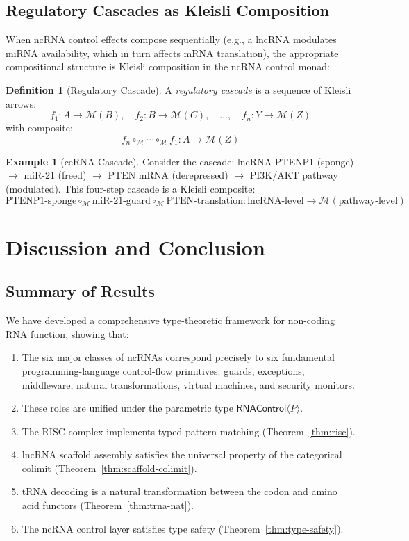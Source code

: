 \documentclass[12pt,a4paper]{article}
\theoremstyle{definition}
\newtheorem{definition}[theorem]{Definition}
\newtheorem{example}[theorem]{Example}
\newcommand{\RNAType}{\mathsf{RNAControl}}
\begin{document}
\subsection{Regulatory Cascades as Kleisli Composition}

When ncRNA control effects compose sequentially (e.g., a lncRNA
modulates miRNA availability, which in turn affects mRNA translation),
the appropriate compositional structure is Kleisli composition in the
ncRNA control monad:

\begin{definition}[Regulatory Cascade]
A \emph{regulatory cascade} is a sequence of Kleisli arrows:
\[
  f_1 : A \to \mathcal{M}(B), \quad
  f_2 : B \to \mathcal{M}(C), \quad \ldots, \quad
  f_n : Y \to \mathcal{M}(Z)
\]
with composite:
\[
  f_n \circ_{\mathcal{M}} \cdots \circ_{\mathcal{M}} f_1
  : A \to \mathcal{M}(Z)
\]
\end{definition}

\begin{example}[ceRNA Cascade]
Consider the cascade: lncRNA PTENP1 (sponge) $\to$ miR-21 (freed) $\to$
PTEN mRNA (derepressed) $\to$ PI3K/AKT pathway (modulated).  This
four-step cascade is a Kleisli composite:
\[
  \text{PTENP1-sponge} \circ_{\mathcal{M}} \text{miR-21-guard}
  \circ_{\mathcal{M}} \text{PTEN-translation}
  : \text{lncRNA-level} \to \mathcal{M}(\text{pathway-level})
\]
\end{example}

\section{Discussion and Conclusion}\label{sec:discussion}

\subsection{Summary of Results}

We have developed a comprehensive type-theoretic framework for
non-coding RNA function, showing that:

\begin{enumerate}[label=(\arabic*)]
  \item The six major classes of ncRNAs correspond precisely to six
    fundamental programming-language control-flow primitives: guards,
    exceptions, middleware, natural transformations, virtual machines,
    and security monitors.
  \item These roles are unified under the parametric type
    $\RNAType\langle P\rangle$.
  \item The RISC complex implements typed pattern matching
    (Theorem~\ref{thm:risc}).
  \item lncRNA scaffold assembly satisfies the universal property
    of the categorical colimit (Theorem~\ref{thm:scaffold-colimit}).
  \item tRNA decoding is a natural transformation between the codon
    and amino acid functors (Theorem~\ref{thm:trna-nat}).
  \item The ncRNA control layer satisfies type safety
    (Theorem~\ref{thm:type-safety}).
\end{enumerate}
\end{document}
